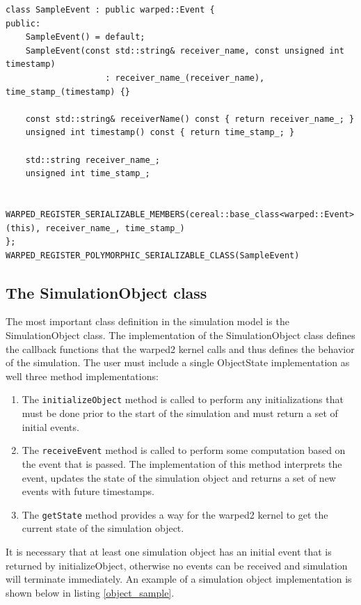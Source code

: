 \documentclass[11pt]{book}
\begin{document}
\begin{lstlisting}[caption=Sample \textsc{warped2} Event Definition, label=event_sample, float]
class SampleEvent : public warped::Event {
public:
    SampleEvent() = default;
    SampleEvent(const std::string& receiver_name, const unsigned int timestamp)
                    : receiver_name_(receiver_name), time_stamp_(timestamp) {}

    const std::string& receiverName() const { return receiver_name_; }
    unsigned int timestamp() const { return time_stamp_; }

    std::string receiver_name_;
    unsigned int time_stamp_;

    WARPED_REGISTER_SERIALIZABLE_MEMBERS(cereal::base_class<warped::Event>(this), receiver_name_, time_stamp_)
};
WARPED_REGISTER_POLYMORPHIC_SERIALIZABLE_CLASS(SampleEvent)
\end{lstlisting}

\subsection{The SimulationObject class}

The most important class definition in the simulation model is the SimulationObject class. The
implementation of the SimulationObject class defines the callback functions that the warped2 kernel
calls and thus defines the behavior of the simulation. The user must include a single ObjectState
implementation as well three method implementations:

\begin{enumerate}

    \item The \texttt{initializeObject} method is called to perform any initializations that must
        be done prior to the start of the simulation and must return a set of initial events.
    \item The \texttt{receiveEvent} method is called to perform some computation based on the event
        that is passed. The implementation of this method interprets the event, updates the state
        of the simulation object and returns a set of new events with future timestamps.
    \item The \texttt{getState} method provides a way for the warped2 kernel to get the current
        state of the simulation object.

\end{enumerate}

It is necessary that at least one simulation object has an initial event that is returned by
initializeObject, otherwise no events can be received and simulation will terminate immediately.
An example of a simulation object implementation is shown below in listing \ref{object_sample}.
\end{document}
